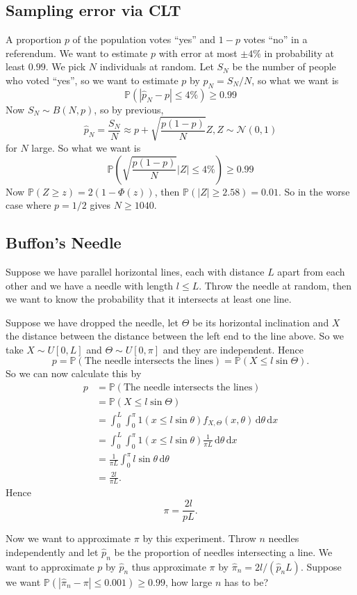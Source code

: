 \subsection{Sampling error via CLT}
A proportion $p$ of the population votes ``yes'' and $1-p$ votes ``no'' in a referendum.
We want to estimate $p$ with error at most $\pm 4\%$ in probability at least $0.99$.
We pick $N$ individuals at random.
Let $S_N$ be the number of people who voted ``yes'', so we want to estimate $p$ by $\hat{p}_N=S_N/N$, so what we want is
$$\mathbb P(|\hat{p}_N-p|\le 4\%)\ge 0.99$$
Now $S_N\sim B(N,p)$, so by previous,
$$\hat{p}_N=\frac{S_N}{N}\approx p+\sqrt{\frac{p(1-p)}{N}}Z,Z\sim\mathcal N(0,1)$$
for $N$ large.
So what we want is
$$\mathbb P\left( \sqrt{\frac{p(1-p)}{N}}|Z|\le 4\% \right)\ge 0.99$$
Now $\mathbb P(Z\ge z)=2(1-\Phi(z))$, then $\mathbb P(|Z|\ge 2.58)=0.01$.
So in the worse case where $p=1/2$ gives $N\ge 1040$.
\subsection{Buffon's Needle}
Suppose we have parallel horizontal lines, each with distance $L$ apart from each other and we have a needle with length $ l \le L$.
Throw the needle at random, then we want to know the probability that it intersects at least one line.

Suppose we have dropped the needle, let $\Theta$ be its horizontal inclination and $X$ the distance between the distance between the left end to the line above.
So we take $X\sim U[0,L]$ and $\Theta\sim U[0,\pi]$ and they are independent.
Hence
$$p=\mathbb P(\text{The needle intersects the lines})=\mathbb P(X\le l \sin\Theta).$$
So we can now calculate this by
\begin{align*}
    p&=\mathbb P(\text{The needle intersects the lines})\\
    &=\mathbb P(X\le l \sin\Theta)\\
    &=\int_0^L\int_0^\pi 1(x\le l\sin\theta)f_{X,\Theta}(x,\theta)\,\mathrm d\theta\,\mathrm dx\\
    &=\int_0^L\int_0^\pi  1(x\le l\sin\theta)\frac{1}{\pi L}\,\mathrm d\theta\,\mathrm dx\\
    &=\frac{1}{\pi L}\int_0^\pi l \sin\theta\,\mathrm d\theta\\
    &=\frac{2 l }{\pi L}.
\end{align*}
Hence
\[
    \pi=\frac{2l}{pL}.
\]

Now we want to approximate $\pi$ by this experiment.
Throw $n$ needles independently and let $\hat{p}_n$ be the proportion of needles intersecting a line.
We want to approximate $p$ by $\hat{p}_n$ thus approximate $\pi$ by $\hat\pi_n=2 l /(\hat{p}_nL)$.
Suppose we want $\mathbb P(|\hat\pi_n-\pi|\le 0.001)\ge 0.99$, how large $n$ has to be?

